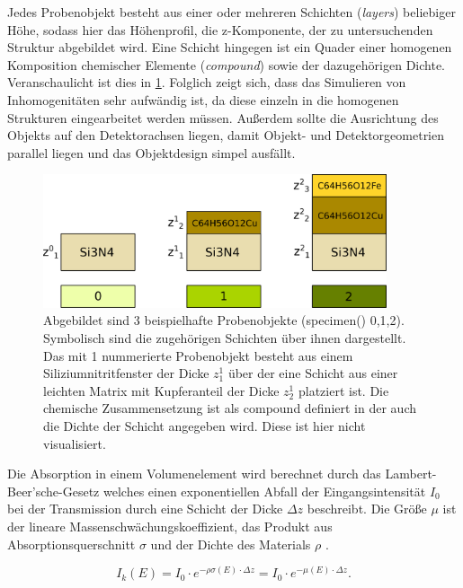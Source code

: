 Jedes Probenobjekt besteht aus einer oder mehreren Schichten (\textit{layers}) beliebiger Höhe, sodass hier das Höhenprofil, die z-Komponente, der zu untersuchenden Struktur abgebildet wird. Eine Schicht hingegen ist ein Quader einer homogenen Komposition chemischer Elemente (\textit{compound}) sowie der dazugehörigen Dichte. Veranschaulicht ist dies in \cref{fig:specimen}. Folglich zeigt sich, dass das Simulieren von Inhomogenitäten sehr aufwändig ist, da diese einzeln in die homogenen Strukturen eingearbeitet werden müssen. Außerdem sollte die Ausrichtung des Objekts auf den Detektorachsen liegen, damit Objekt- und Detektorgeometrien parallel liegen und das Objektdesign simpel ausfällt. \newline

\begin{figure}[H]
  \centering
     \includegraphics[width=0.9\textwidth]{illustrations/specimen.png}
  \caption[Darstellung Probenobjekte]{Abgebildet sind 3 beispielhafte Probenobjekte (specimen() 0,1,2). Symbolisch sind die zugehörigen Schichten über ihnen dargestellt. Das mit 1 nummerierte Probenobjekt besteht aus einem Siliziumnitritfenster der Dicke $z_{1}^{1}$ über der eine Schicht aus einer leichten Matrix mit Kupferanteil der Dicke $z_{2}^{1}$ platziert ist. Die chemische Zusammensetzung ist als compound definiert in der auch die Dichte der Schicht angegeben wird. Diese ist hier nicht visualisiert.}
  \label{fig:specimen}
\end{figure}


Die Absorption in einem Volumenelement wird berechnet durch das Lambert-Beer'sche-Gesetz welches einen exponentiellen Abfall der Eingangsintensität $I_{0}$ bei der Transmission durch eine Schicht der Dicke $\Delta z$ beschreibt. Die Größe $\mu$ ist der lineare Massenschwächungskoeffizient, das Produkt aus Absorptionsquerschnitt $\sigma$ und der Dichte des Materials $\rho$ \cite[S.~13]{gaft}.

\begin{equation}
I_{k}(E)=I_{0}\cdot e^{-\rho \sigma(E) \cdot \Delta z}=I_{0}\cdot e^{-\mu(E) \cdot \Delta z}.
\end{equation} 

